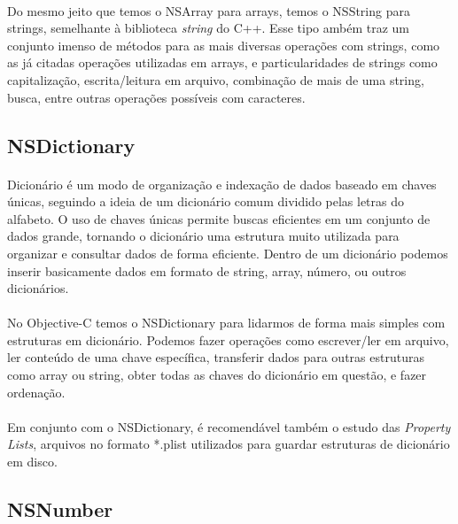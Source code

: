 \documentclass[a4paper,12pt,brazil,doubleside]{book}
\begin{document}
\paragraph{}Do mesmo jeito que temos o NSArray para arrays, temos o NSString para strings, semelhante à biblioteca \emph{string} do C++. Esse tipo ambém traz um conjunto imenso de métodos para as mais diversas operações com strings, como as já citadas operações utilizadas em arrays, e particularidades de strings como capitalização, escrita/leitura em arquivo, combinação de mais de uma string, busca, entre outras operações possíveis com caracteres.

\bigskip

\subsection{NSDictionary}

\paragraph{}Dicionário é um modo de organização e indexação de dados baseado em chaves únicas, seguindo a ideia de um dicionário comum dividido pelas letras do alfabeto. O uso de chaves únicas permite buscas eficientes em um conjunto de dados grande, tornando o dicionário uma estrutura muito utilizada para organizar e consultar dados de forma eficiente. Dentro de um dicionário podemos inserir basicamente dados em formato de string, array, número, ou outros dicionários.
\paragraph{}No Objective-C temos o NSDictionary para lidarmos de forma mais simples com estruturas em dicionário. Podemos fazer operações como escrever/ler em arquivo, ler conteúdo de uma chave específica, transferir dados para outras estruturas como array ou string, obter todas as chaves do dicionário em questão, e fazer ordenação.
\paragraph{}Em conjunto com o NSDictionary, é recomendável também o estudo das \emph{Property Lists}, arquivos no formato *.plist utilizados para guardar estruturas de dicionário em disco.

\bigskip

\subsection{NSNumber}
\end{document}
